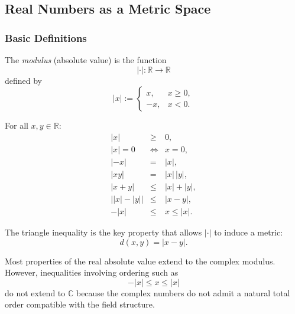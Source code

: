 
\subsection{Real Numbers as a Metric Space}

\subsubsection{Basic Definitions}

\begin{definition}
The \emph{modulus} (absolute value) is the function
\[
|\cdot| : \mathbb{R} \to \mathbb{R}
\]
defined by
\[
|x| :=
\begin{cases}
x, & x \ge 0,\\
-x, & x < 0.
\end{cases}
\]


\end{definition}

\begin{theorem}
For all $x,y\in\mathbb{R}$:
\[
\begin{array}{rcl}
|x| &\ge& 0, \\[0.35em]
|x| = 0 &\Longleftrightarrow& x=0, \\[0.35em]
|-x| &=& |x|, \\[0.35em]
|xy| &=& |x|\,|y|, \\[0.35em]
|x+y| &\le& |x|+|y|, \\[0.35em]
\bigl||x|-|y|\bigr| &\le& |x-y|, \\[0.35em]
-|x| &\le& x \le |x|.
\end{array}
\]
\end{theorem}

\begin{remark}
The triangle inequality is the key property that allows
$|\cdot|$ to induce a metric:
\[
d(x,y)=|x-y|.
\]
\end{remark}
\begin{remark}
Most properties of the real absolute value extend to the complex modulus.
However, inequalities involving ordering such as
\[
-|x| \le x \le |x|
\]
do not extend to $\mathbb{C}$ because the complex numbers do not admit
a natural total order compatible with the field structure.
\end{remark}

